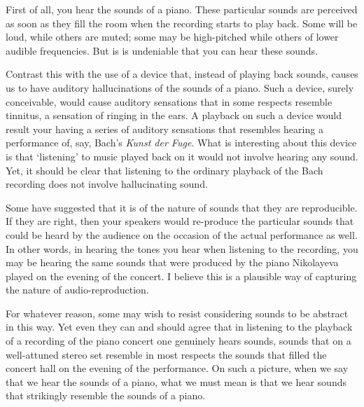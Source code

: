 \documentclass[sloppy, journal, git, bytitle, dodraft]{humapap}
\begin{document}
First of all, you hear the sounds of a piano. These particular sounds are perceived as soon as they fill the room when the recording starts to play back. Some will be loud, while others are muted; some may be high-pitched while others of lower audible frequencies. But is is undeniable that you can hear these sounds.   

Contrast this with the use of a device that, instead of playing back sounds, causes us to have auditory hallucinations of the sounds of a piano. Such a device, surely conceivable, would cause auditory sensations that in some respects resemble tinnitus, a sensation of ringing in the ears. A playback on such a device would result your having a series of auditory sensations that resembles hearing a performance of, say, Bach's \emph{Kunst der Fuge}. What is interesting about this device is that `listening' to music played back on it would not involve hearing any sound. Yet, it should be clear that listening to the ordinary playback of the Bach recording does not involve hallucinating sound. 

Some have suggested that it is of the nature of sounds that they are reproducible. If they are right, then your speakers would re-produce the particular sounds that could be heard by the audience on the occasion of the actual performance as well. In other words, in hearing the tones you hear when listening to the recording, you may be hearing the same sounds that were produced by the piano Nikolayeva played on the evening of the concert. I believe this is a plausible way of capturing the nature of audio-reproduction. 

For whatever reason, some may wish to resist considering sounds to be abstract in this way. Yet even they can and should agree that in listening to the playback of a recording of the piano concert one genuinely hears sounds, sounds that on a well-attuned stereo set resemble in most respects the sounds that filled the concert hall on the evening of the performance. On such a picture, when we say that we hear the sounds of a piano, what we must mean is that we hear sounds that strikingly resemble the sounds of a piano.
\end{document}
